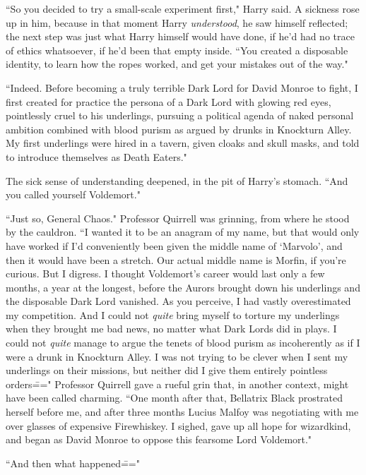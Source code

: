 ``So you decided to try a small-scale experiment first," Harry said. A sickness rose up in him, because in that moment Harry \emph{understood}, he saw himself reflected; the next step was just what Harry himself would have done, if he'd had no trace of ethics whatsoever, if he'd been that empty inside. ``You created a disposable identity, to learn how the ropes worked, and get your mistakes out of the way."

``Indeed. Before becoming a truly terrible Dark Lord for David Monroe to fight, I first created for practice the persona of a Dark Lord with glowing red eyes, pointlessly cruel to his underlings, pursuing a political agenda of naked personal ambition combined with blood purism as argued by drunks in Knockturn Alley. My first underlings were hired in a tavern, given cloaks and skull masks, and told to introduce themselves as Death Eaters."

The sick sense of understanding deepened, in the pit of Harry's stomach. ``And you called yourself Voldemort."

``Just so, General Chaos." Professor Quirrell was grinning, from where he stood by the cauldron. ``I wanted it to be an anagram of my name, but that would only have worked if I'd conveniently been given the middle name of `Marvolo', and then it would have been a stretch. Our actual middle name is Morfin, if you're curious. But I digress. I thought Voldemort's career would last only a few months, a year at the longest, before the Aurors brought down his underlings and the disposable Dark Lord vanished. As you perceive, I had vastly overestimated my competition. And I could not \emph{quite} bring myself to torture my underlings when they brought me bad news, no matter what Dark Lords did in plays. I could not \emph{quite} manage to argue the tenets of blood purism as incoherently as if I were a drunk in Knockturn Alley. I was not trying to be clever when I sent my underlings on their missions, but neither did I give them entirely pointless orders\===" Professor Quirrell gave a rueful grin that, in another context, might have been called charming. ``One month after that, Bellatrix Black prostrated herself before me, and after three months Lucius Malfoy was negotiating with me over glasses of expensive Firewhiskey. I sighed, gave up all hope for wizardkind, and began as David Monroe to oppose this fearsome Lord Voldemort."

``And then what happened\==="


